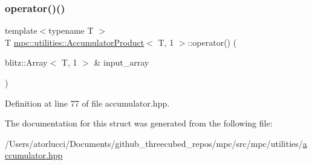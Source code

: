 \subsubsection{\texorpdfstring{operator()()}{operator()()}}
{\footnotesize\ttfamily template$<$typename T $>$ \\
T \mbox{\hyperlink{structmpc_1_1utilities_1_1_accumulator_product}{mpc\+::utilities\+::\+Accumulator\+Product}}$<$ T, 1 $>$\+::operator() (\begin{DoxyParamCaption}\item[{blitz\+::\+Array$<$ T, 1 $>$ \&}]{input\+\_\+array }\end{DoxyParamCaption})\hspace{0.3cm}{\ttfamily [inline]}}



Definition at line 77 of file accumulator.\+hpp.



The documentation for this struct was generated from the following file\+:\begin{DoxyCompactItemize}
\item 
/\+Users/atorlucci/\+Documents/github\+\_\+threecubed\+\_\+repos/mpc/src/mpc/utilities/\mbox{\hyperlink{accumulator_8hpp}{accumulator.\+hpp}}\end{DoxyCompactItemize}
